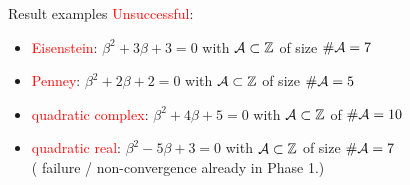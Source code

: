 \documentclass[11pt]{beamer}
\begin{document}
\begin{frame}{Result examples}
    \smallskip
    \pause
    \textcolor{red}{{Unsuccessful}}: %
        \begin{itemize}
            \item \textcolor{red}{Eisenstein}: $ \beta^2 + 3\beta + 3 = 0 $ with \textcolor{red}{$ \mathcal{A} \subset \mathbb{Z}$} of size \textcolor{red}{$\# \mathcal{A} = 7 $}
            \item \textcolor{red}{Penney}: $ \beta^2 + 2\beta + 2 = 0 $ with \textcolor{red}{$ \mathcal{A} \subset \mathbb{Z}$} of size \textcolor{red}{$\# \mathcal{A} = 5 $}
            \item \textcolor{red}{quadratic complex}: $\beta^2 + 4\beta + 5 = 0$ with \textcolor{red}{$\mathcal{A} \subset \mathbb{Z}$} of \textcolor{red}{$\# \mathcal{A} = 10$}
            \item \textcolor{red}{quadratic real}: $\beta^2 - 5\beta + 3 = 0$ with \textcolor{red}{$\mathcal{A} \subset \mathbb{Z}$} of size \textcolor{red}{$\# \mathcal{A} = 7$} \\
                (
                failure / non-convergence
                already in Phase 1.)
        \end{itemize}

\end{frame}
\end{document}
